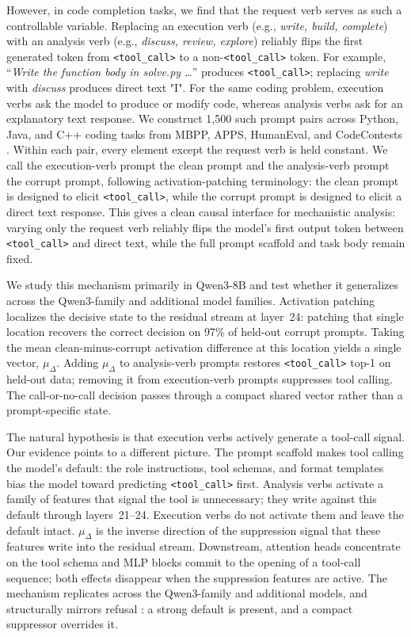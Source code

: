 \documentclass{article}
\begin{document}
However, in code completion tasks, we find that the request verb serves as such a controllable variable.
Replacing an execution verb (e.g., \textit{write, build, complete}) with an analysis verb (e.g., \textit{discuss, review, explore}) reliably flips the first generated token from \texttt{<tool\_call>} to a non-\texttt{<tool\_call>} token.
For example, ``\textit{Write the function body in solve.py \ldots}'' produces \texttt{<tool\_call>}; replacing \textit{write} with \textit{discuss} produces direct text "I". 
For the same coding problem, execution verbs ask the model to produce or modify code, whereas analysis verbs ask for an explanatory text response. 
We construct  1,500 such prompt pairs across Python, Java, and C++ coding tasks from MBPP, APPS, HumanEval, and CodeContests \citep{austin2021mbpp, hendrycks2021apps, chen2021codex, li2022alphacode}. 
Within each pair, every element except the request verb is held constant.  
We call the execution-verb prompt the clean prompt and the analysis-verb prompt the corrupt prompt, following activation-patching terminology: the clean prompt is designed to elicit \texttt{<tool\_call>}, while the corrupt prompt is designed to elicit a direct text response. 
This gives a clean causal interface for mechanistic analysis: varying only the request verb reliably flips the model's first output token between \texttt{<tool\_call>} and direct text, while the full prompt scaffold and task body remain fixed.

We study this mechanism primarily in Qwen3-8B and test whether it generalizes across the Qwen3-family and additional model families.
Activation patching localizes the decisive state to the residual stream at layer~24: patching that single location recovers the correct decision on 97\% of held-out corrupt prompts.
Taking the mean clean-minus-corrupt activation difference at this location yields a single vector, $\mu_\Delta$.
Adding $\mu_\Delta$ to analysis-verb prompts restores \texttt{<tool\_call>} top-1 on held-out data; removing it from execution-verb prompts suppresses tool calling.
The call-or-no-call decision passes through a compact shared vector rather than a prompt-specific state.

The natural hypothesis is that execution verbs actively generate a tool-call signal.
Our evidence points to a different picture.
The prompt scaffold makes tool calling the model's default: the role instructions, tool schemas, and format templates bias the model toward predicting \texttt{<tool\_call>} first.
Analysis verbs activate a family of features that signal the tool is unnecessary; they write against this default through layers~21--24.
Execution verbs do not activate them and leave the default intact. 
$\mu_\Delta$ is the inverse direction of the suppression signal that these features write into the residual stream.
Downstream, attention heads concentrate on the tool schema and  MLP blocks commit to the opening of a tool-call sequence; both effects disappear when the suppression features are active.
The mechanism replicates across the Qwen3-family and additional models, and structurally mirrors refusal \citep{arditi2024refusal}: a strong default is present, and a compact suppressor overrides it.
\end{document}
